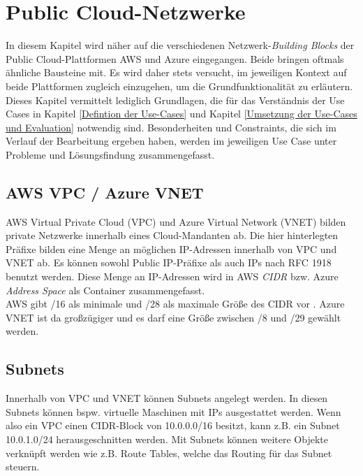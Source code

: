 \section{Public Cloud-Netzwerke}\label{public-cloud-networking}
In diesem Kapitel wird näher auf die verschiedenen Netzwerk-\textit{Building Blocks} der Public Cloud-Plattformen AWS und Azure eingegangen. Beide bringen oftmals ähnliche Bausteine mit. Es wird daher stets versucht, im jeweiligen Kontext auf beide Plattformen zugleich einzugehen, um die Grundfunktionalität zu erläutern.
Dieses Kapitel vermittelt lediglich Grundlagen, die für das Verständnis der Use Cases in Kapitel \ref{Defintion der Use-Cases} und Kapitel \ref{Umsetzung der Use-Cases und Evaluation} notwendig sind. Besonderheiten und Constraints, die sich im Verlauf der Bearbeitung ergeben haben, werden im jeweiligen Use Case unter \glqq Probleme und Lösungsfindung\grqq{} zusammengefasst.

\subsection{AWS VPC / Azure VNET}
AWS Virtual Private Cloud (VPC) und Azure Virtual Network (VNET) bilden private Netzwerke innerhalb eines Cloud-Mandanten ab. Die hier hinterlegten Präfixe bilden eine Menge an möglichen IP-Adressen innerhalb von \gls{VPC} und \gls{VNET} ab. Es können sowohl Public IP-Präfixe als auch IPs nach \gls{RFC} 1918 benutzt werden. Diese Menge an IP-Adressen wird in AWS \textit{\gls{CIDR}} bzw. Azure \textit{Address Space} als Container zusammengefasst.\\
AWS gibt /16 als minimale und /28 als maximale Größe des \gls{CIDR} vor \cite[S.100]{awsug2020}. Azure \gls{VNET} ist da großzügiger und es darf eine Größe zwischen /8 und /29 gewählt werden\cite[S.10]{Toroman2019}. 
\subsection{Subnets}
Innerhalb von \gls{VPC} und \gls{VNET} können Subnets angelegt werden. In diesen Subnets können bspw. virtuelle Maschinen mit IPs ausgestattet werden. Wenn also ein \gls{VPC} einen \gls{CIDR}-Block von 10.0.0.0/16 besitzt, kann z.B. ein Subnet 10.0.1.0/24 \glqq herausgeschnitten\grqq{} werden. Mit Subnets können weitere Objekte verknüpft werden wie z.B. Route Tables, welche das Routing für das Subnet steuern.

